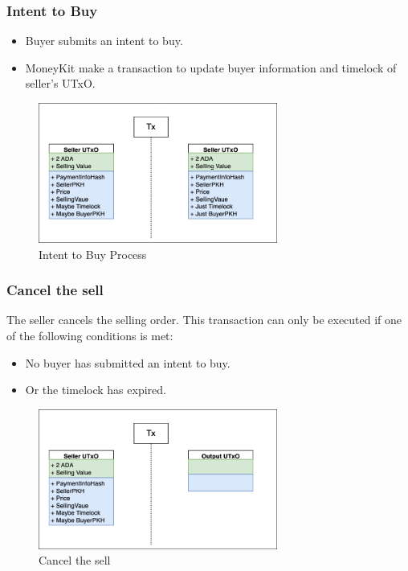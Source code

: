 \documentclass[11pt,oneside,a4paper]{article}
\begin{document}
\subsubsection{Intent to Buy}

\begin{itemize}
  \item Buyer submits an intent to buy.
  \item MoneyKit make a transaction to update buyer information and timelock of seller's UTxO.
\end{itemize}

\begin{figure}[H]
  \centering
  \includegraphics[width=0.7\textwidth]{img/intent_to_buy.png}
  \caption{Intent to Buy Process}
  \label{fig:intent_to_buy}
\end{figure}


\subsubsection{Cancel the sell}
The seller cancels the selling order. This transaction can only be executed if one of the following conditions is met:
\begin{itemize}
  \item No buyer has submitted an intent to buy.
  \item Or the timelock has expired.
\end{itemize}

\begin{figure}[H]
  \centering
  \includegraphics[width=0.7\textwidth]{img/cancel.png}
  \caption{Cancel the sell}
  \label{fig:cancel}
\end{figure}
\end{document}

